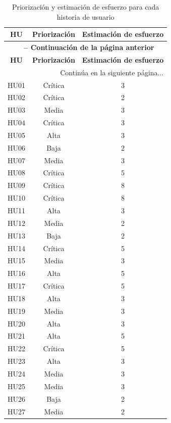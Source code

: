 \begin{longtable}{|c|c|c|}
  \caption{Priorización y estimación de esfuerzo para cada historia de usuario} \label{tab:prioridad}\\
  \hline
  \textbf{HU} & \textbf{Priorización} & \textbf{Estimación de esfuerzo} \\
  \hline
  \endfirsthead
  \multicolumn{3}{c}{\textbf{\tablename\ \thetable{} -- Continuación de la página anterior}} \\
  \hline
  \textbf{HU} & \textbf{Priorización} & \textbf{Estimación de esfuerzo} \\
  \hline
  \endhead
  \hline
  \multicolumn{3}{|r|}{Continúa en la siguiente página...} \\
  \hline
  \endfoot
  \hline
  \endlastfoot
  HU01 & Crítica & 3 \\ \hline
  HU02 & Crítica & 2 \\ \hline
  HU03 & Media & 3 \\ \hline
  HU04 & Crítica & 3 \\ \hline
  HU05 & Alta & 3 \\ \hline
  HU06 & Baja & 2 \\ \hline
  HU07 & Media & 3 \\ \hline
  HU08 & Crítica & 5 \\ \hline
  HU09 & Crítica & 8 \\ \hline
  HU10 & Crítica & 8 \\ \hline
  HU11 & Alta & 3 \\ \hline
  HU12 & Media & 2 \\ \hline
  HU13 & Baja & 2 \\ \hline
  HU14 & Crítica & 5 \\ \hline
  HU15 & Media & 3 \\ \hline
  HU16 & Alta & 5 \\ \hline
  HU17 & Crítica & 5 \\ \hline
  HU18 & Alta & 3 \\ \hline
  HU19 & Media & 3 \\ \hline
  HU20 & Alta & 3 \\ \hline
  HU21 & Alta & 5 \\ \hline
  HU22 & Crítica & 5 \\ \hline
  HU23 & Alta & 3 \\ \hline
  HU24 & Media & 3 \\ \hline
  HU25 & Media & 3 \\ \hline
  HU26 & Baja & 2 \\ \hline
  HU27 & Media & 2 \\ \hline

\end{longtable}
